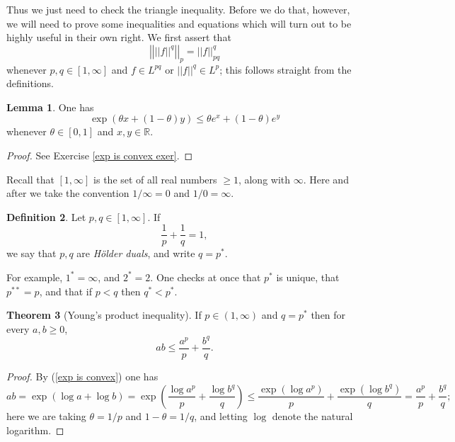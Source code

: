 \documentclass[12pt]{book}
\newcommand{\RR}{\mathbb{R}}
\newcommand{\dfn}[1]{\emph{#1}\index{#1}}
\theoremstyle{definition}
\newtheorem{theorem}{Theorem}[section]
\newtheorem{lemma}[theorem]{Lemma}
\newtheorem{definition}[theorem]{Definition}
\begin{document}
Thus we just need to check the triangle inequality. Before we do that, however, we will need to prove some inequalities and equations which will turn out to be highly useful in their own right.
We first assert that
\begin{equation}
\label{pull exponent of Lp}
\left|\left|||f||^q\right|\right|_p = ||f||_{pq}^q
\end{equation}
whenever $p, q \in [1, \infty]$ and $f \in L^{pq}$ or $||f||^q \in L^p$; this follows straight from the definitions.

\begin{lemma}
One has
\begin{equation}
\label{exp is convex}
\exp(\theta x + (1 - \theta)y) \leq \theta e^x + (1 - \theta)e^y
\end{equation}
whenever $\theta \in [0, 1]$ and $x, y \in \RR$.
\end{lemma}
\begin{proof}
See Exercise \ref{exp is convex exer}.
\end{proof}

Recall that $[1, \infty]$ is the set of all real numbers $\geq 1$, along with $\infty$.
Here and after we take the convention $1/\infty = 0$ and $1/0 = \infty$.

\begin{definition}
Let $p, q \in [1, \infty]$. If
$$\frac{1}{p} + \frac{1}{q} = 1,$$
we say that $p, q$ are \dfn{H\"older duals}, and write $q = p^*$.
\end{definition}

For example, $1^* = \infty$, and $2^* = 2$. One checks at once that $p^*$ is unique, that $p^{**} = p$, and that if $p < q$ then $q^* < p^*$.

\begin{theorem}[Young's product inequality]
If $p \in (1, \infty)$ and $q = p^*$ then for every $a,b \geq 0$,
$$ab \leq \frac{a^p}{p} + \frac{b^q}{q}.$$
\end{theorem}
\begin{proof}
By (\ref{exp is convex}) one has
$$ab = \exp(\log a + \log b) = \exp\left(\frac{\log a^p}{p} + \frac{\log b^q}{q}\right) \leq \frac{\exp(\log a^p)}{p} + \frac{\exp(\log b^q)}{q} = \frac{a^p}{p} + \frac{b^q}{q};$$
here we are taking $\theta = 1/p$ and $1 - \theta = 1/q$, and letting $\log$ denote the natural logarithm.
\end{proof}
\end{document}
